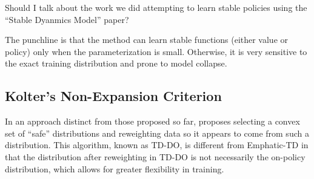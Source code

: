 \documentclass[11pt]{article}
\begin{document}
Should I talk about the work we did attempting to learn stable policies using the ``Stable Dyanmics Model'' paper? 

The punchline is that the method can learn stable functions (either value or policy) only when the parameterization is small. Otherwise, it is very sensitive to the exact training distribution and prone to model collapse.

\subsection{Kolter's Non-Expansion Criterion }

In an approach distinct from those proposed so far, \cite{kolter2011fixed} proposes selecting a convex set of ``safe'' distributions and reweighting data so it appears to come from such a distribution. This algorithm, known as TD-DO, is different from Emphatic-TD in that the distribution after reweighting in TD-DO is not necessarily the on-policy distribution, which allows for greater flexibility in training.
\end{document}
